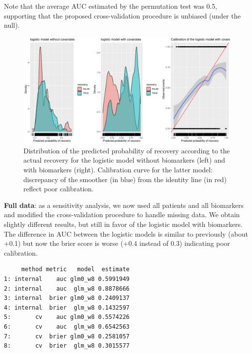 \documentclass[12pt]{article}
\begin{document}
\bigskip

Note that the average AUC estimated by the permutation test was 0.5,
supporting that the proposed cross-validation procedure is unbiased
(under the null).

\clearpage

\begin{figure}[!h]
\centering
\includegraphics[trim={0 0 0 0},width=1\textwidth]{./figures/gg-perfW8-densCali.pdf}
\caption{\label{fig:perfW8}Distribution of the predicted probability of recovery according to the actual recovery for the logistic model without biomarkers (left) and with biomarkers (right). Calibration curve for the latter model: discrepancy of the smoother (in blue) from the identity line (in red) reflect poor calibration.}
\end{figure}


\bigskip

\textbf{Full data}: as a sensitivity analysis, we now used all patients and
all biomarkers and modified the cross-validation procedure to handle
missing data. We obtain slightly different results, but still in favor
of the logistic model with biomarkers. The difference in AUC between
the logistic models is similar to previously (about +0.1) but now the
brier score is worse (+0.4 instead of 0.3) indicating poor
calibration.

\begin{verbatim}
     method metric   model  estimate
1: internal    auc glm0_w8 0.5991949
2: internal    auc  glm_w8 0.8878666
3: internal  brier glm0_w8 0.2409137
4: internal  brier  glm_w8 0.1432597
5:       cv    auc glm0_w8 0.5574226
6:       cv    auc  glm_w8 0.6542563
7:       cv  brier glm0_w8 0.2581057
8:       cv  brier  glm_w8 0.3015577
\end{verbatim}



\clearpage
\end{document}
